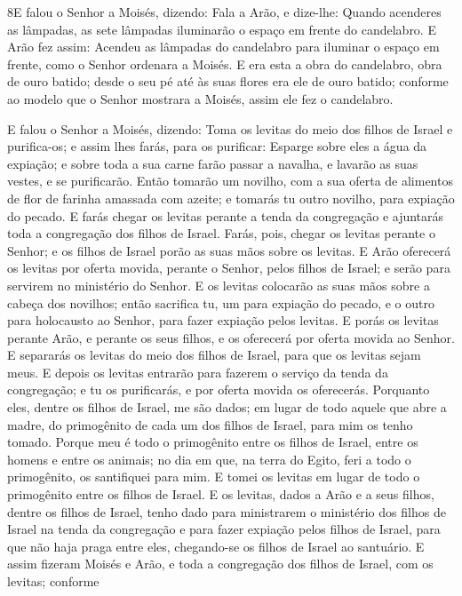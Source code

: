 \medskip

\lettrine{8} E falou o Senhor a Moisés, dizendo: Fala a
Arão, e dize-lhe: Quando acenderes as lâmpadas, as sete lâmpadas
iluminarão o espaço em frente do candelabro. E Arão fez assim:
Acendeu as lâmpadas do candelabro para iluminar o espaço em frente,
como o Senhor ordenara a Moisés. E era esta a obra do
candelabro, obra de ouro batido; desde o seu pé até às suas flores
era ele de ouro batido; conforme ao modelo que o Senhor mostrara a
Moisés, assim ele fez o candelabro.

E falou o Senhor a Moisés, dizendo: Toma os levitas do meio
dos filhos de Israel e purifica-os; e assim lhes farás, para os
purificar: Esparge sobre eles a água da expiação; e sobre toda a sua
carne farão passar a navalha, e lavarão as suas vestes, e se
purificarão. Então tomarão um novilho, com a sua oferta de
alimentos de flor de farinha amassada com azeite; e tomarás tu outro
novilho, para expiação do pecado. E farás chegar os levitas
perante a tenda da congregação e ajuntarás toda a congregação dos
filhos de Israel. Farás, pois, chegar os levitas perante o
Senhor; e os filhos de Israel porão as suas mãos sobre os levitas.
E Arão oferecerá os levitas por oferta movida, perante o
Senhor, pelos filhos de Israel; e serão para servirem no ministério
do Senhor. E os levitas colocarão as suas mãos sobre a cabeça
dos novilhos; então sacrifica tu, um para expiação do pecado, e o
outro para holocausto ao Senhor, para fazer expiação pelos levitas.
E porás os levitas perante Arão, e perante os seus filhos, e
os oferecerá por oferta movida ao Senhor. E separarás os
levitas do meio dos filhos de Israel, para que os levitas sejam
meus. E depois os levitas entrarão para fazerem o serviço da
tenda da congregação; e tu os purificarás, e por oferta movida os
oferecerás. Porquanto eles, dentre os filhos de Israel, me
são dados; em lugar de todo aquele que abre a madre, do primogênito
de cada um dos filhos de Israel, para mim os tenho tomado.
Porque meu é todo o primogênito entre os filhos de Israel,
entre os homens e entre os animais; no dia em que, na terra do
Egito, feri a todo o primogênito, os santifiquei para mim. E
tomei os levitas em lugar de todo o primogênito entre os filhos de
Israel. E os levitas, dados a Arão e a seus filhos, dentre os
filhos de Israel, tenho dado para ministrarem o ministério dos
filhos de Israel na tenda da congregação e para fazer expiação pelos
filhos de Israel, para que não haja praga entre eles, chegando-se os
filhos de Israel ao santuário. E assim fizeram Moisés e Arão,
e toda a congregação dos filhos de Israel, com os levitas; conforme
